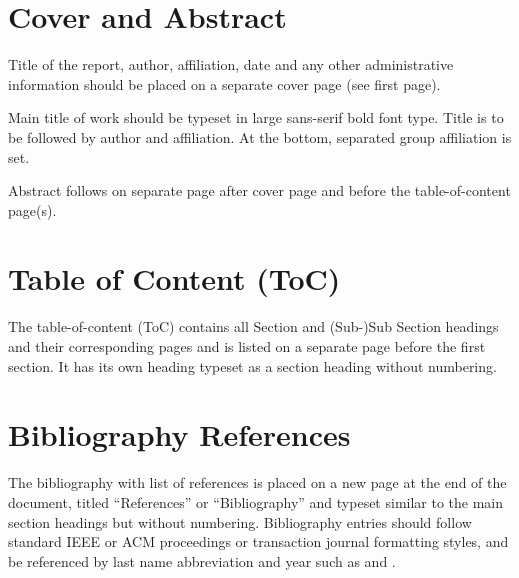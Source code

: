 \documentclass[11pt, a4paper,oneside,chapterprefix=false]{scrbook}
\begin{document}
\section{Cover and Abstract}

Title of the report, author, affiliation, date and any other administrative information should be placed on a separate cover page (see first page).

Main title of work should be typeset in large sans-serif bold font type. Title is to be followed by author and affiliation. At the bottom, separated group affiliation is set.

Abstract follows on separate page after cover page and before the table-of-content page(s).


\section{Table of Content (ToC)}

The table-of-content (ToC) contains all Section and (Sub-)Sub Section headings and their corresponding pages and is listed on a separate page before the first section. It has its own heading typeset as a section heading without numbering.


\section{Bibliography References}

The bibliography with list of references is placed on a new page at the end of the document, titled ``References'' or ``Bibliography'' and typeset similar to the main section headings but without numbering. Bibliography entries should follow standard IEEE or ACM proceedings or transaction journal formatting styles, and be referenced by last name abbreviation and year such as \cite{Pajarola:07} and \cite{GSSP:10}.
\end{document}

